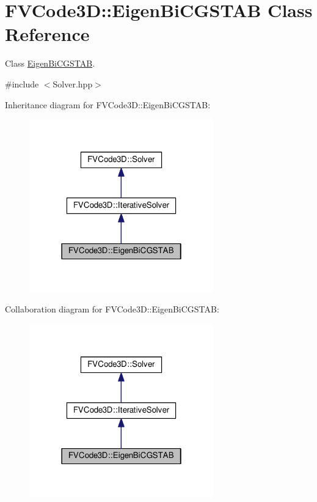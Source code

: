 \hypertarget{classFVCode3D_1_1EigenBiCGSTAB}{}\section{F\+V\+Code3D\+:\+:Eigen\+Bi\+C\+G\+S\+T\+AB Class Reference}
\label{classFVCode3D_1_1EigenBiCGSTAB}


Class \hyperlink{classFVCode3D_1_1EigenBiCGSTAB}{Eigen\+Bi\+C\+G\+S\+T\+AB}.  




{\ttfamily \#include $<$Solver.\+hpp$>$}



Inheritance diagram for F\+V\+Code3D\+:\+:Eigen\+Bi\+C\+G\+S\+T\+AB\+:
\nopagebreak
\begin{figure}[H]
\begin{center}
\leavevmode
\includegraphics[width=226pt]{classFVCode3D_1_1EigenBiCGSTAB__inherit__graph}
\end{center}
\end{figure}


Collaboration diagram for F\+V\+Code3D\+:\+:Eigen\+Bi\+C\+G\+S\+T\+AB\+:
\nopagebreak
\begin{figure}[H]
\begin{center}
\leavevmode
\includegraphics[width=226pt]{classFVCode3D_1_1EigenBiCGSTAB__coll__graph}
\end{center}
\end{figure}
